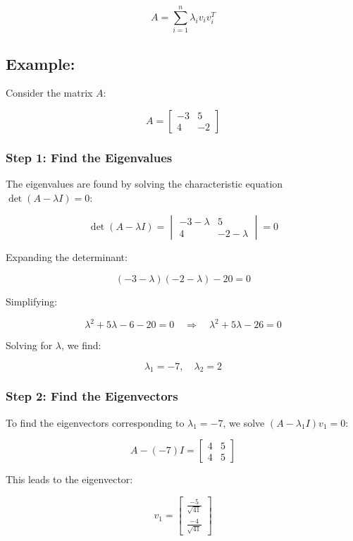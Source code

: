\documentclass{article}
\begin{document}
\[
A = \sum_{i=1}^{n} \lambda_i v_i v_i^T
\]

\subsection*{Example:}
Consider the matrix \( A \):

\[
A = \begin{bmatrix}
    -3 & 5 \\
    4 & -2
\end{bmatrix}
\]

\subsubsection*{Step 1: Find the Eigenvalues}

The eigenvalues are found by solving the characteristic equation \( \det(A - \lambda I) = 0 \):

\[
\det(A - \lambda I) = \begin{vmatrix}
    -3 - \lambda & 5 \\
    4 & -2 - \lambda
\end{vmatrix} = 0
\]

Expanding the determinant:

\[
(-3 - \lambda)(-2 - \lambda) - 20 = 0
\]

Simplifying:

\[
\lambda^2 + 5\lambda - 6 - 20 = 0 \quad \Rightarrow \quad \lambda^2 + 5\lambda - 26 = 0
\]

Solving for \( \lambda \), we find:

\[
\lambda_1 = -7, \quad \lambda_2 = 2
\]

\subsubsection*{Step 2: Find the Eigenvectors}

To find the eigenvectors corresponding to \( \lambda_1 = -7 \), we solve \( (A - \lambda_1 I) v_1 = 0 \):

\[
A - (-7)I = \begin{bmatrix}
    4 & 5 \\
    4 & 5
\end{bmatrix}
\]

This leads to the eigenvector:

\[
v_1 = \begin{bmatrix}
    \frac{-5}{\sqrt{41}} \\
    \frac{-4}{\sqrt{41}}
\end{bmatrix}
\]
\end{document}
